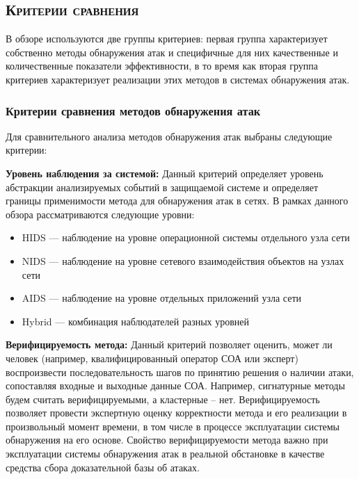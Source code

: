 


\subsection{\textsc{Критерии сравнения}}  

В обзоре используются две группы критериев: первая группа характеризует собственно методы обнаружения атак и специфичные для них качественные и количественные показатели эффективности, в то время как вторая группа критериев характеризует реализации этих методов в системах обнаружения атак.

\subsubsection{Критерии сравнения методов обнаружения атак}

Для сравнительного анализа методов обнаружения атак выбраны следующие критерии:

\textbf{Уровень наблюдения за системой:} Данный критерий определяет уровень абстракции анализируемых событий в защищаемой системе и определяет границы применимости метода для обнаружения атак в сетях. В рамках данного обзора рассматриваются следующие уровни:

\begin{itemize}

\item HIDS --- наблюдение на уровне операционной системы отдельного узла сети
\item NIDS --- наблюдение на уровне сетевого взаимодействия объектов на узлах сети
\item AIDS --- наблюдение на уровне отдельных приложений узла сети
\item Hybrid --- комбинация наблюдателей разных уровней

\end{itemize}

\textbf{Верифицируемость метода:} Данный критерий позволяет оценить, может ли человек (например, квалифицированный оператор СОА или эксперт) воспроизвести последовательность шагов по принятию решения о наличии атаки, сопоставляя входные и выходные данные СОА. Например, сигнатурные методы будем считать верифицируемыми, а кластерные – нет. Верифицируемость позволяет провести экспертную оценку корректности метода и его реализации в произвольный момент времени, в том числе в процессе эксплуатации системы обнаружения на его основе. Свойство верифицируемости метода важно при эксплуатации системы обнаружения атак в реальной обстановке в качестве средства сбора доказательной базы об атаках.

